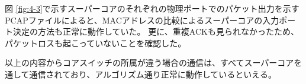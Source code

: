 図 \ref{fig:4-3}で示すスーパーコアのそれぞれの物理ポートでのパケット出力を示すPCAPファイルによると、MACアドレスの比較によるスーパーコアの入力ポート決定の方法も正常に動作していた。
更に、重複ACKも見られなかったため、パケットロスも起こっていないことを確認した。

以上の内容からコアスイッチの所属が違う場合の通信は、すべてスーパーコアを通して通信されており、アルゴリズム通り正常に動作しているといえる。